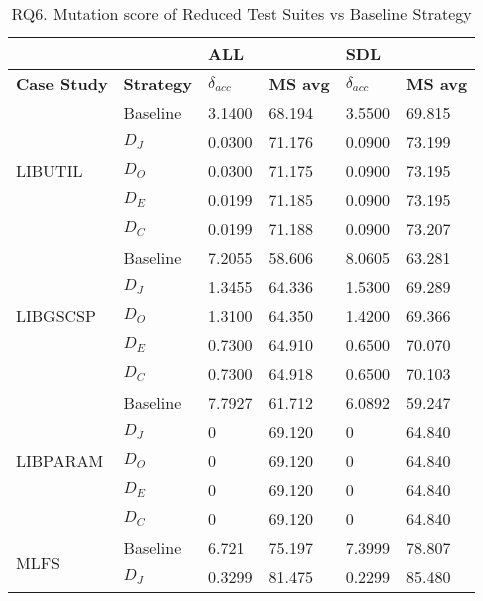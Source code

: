 
\begin{table}[]
\centering
\scriptsize
\caption{RQ6. Mutation score of Reduced Test Suites vs Baseline Strategy}
\label{table:results:msReducedBaseline} 
\begin{tabular}{|llllll|}
\hline
           &          & \textbf{ALL}  &  & \textbf{SDL} &    \\
\hline
\textbf{Case Study} & \textbf{Strategy} & \textbf{$\delta_{acc}$} & \textbf{MS avg} & \textbf{$\delta_{acc}$} & \textbf{MS avg}  \\
\hline
\multirow{5}{*}{LIBUTIL}    & Baseline & 3.1400 & 68.194 & 3.5500  &69.815 \\
           & $D_J$                    & 0.0300  & 71.176 & 0.0900  &73.199 \\
           & $D_O$                    & 0.0300  & 71.175 & 0.0900  &73.195 \\
           & $D_E$                    & 0.0199  & 71.185 & 0.0900  &73.195 \\
           & $D_C$                    & 0.0199  & 71.188 & 0.0900  &73.207\\
\hline
\multirow{5}{*}{LIBGSCSP}   & Baseline & 7.2055 & 58.606 & 8.0605 & 63.281  \\
           & $D_J$                    & 1.3455  & 64.336 &1.5300 & 69.289  \\
           & $D_O$                    & 1.3100  & 64.350  &1.4200 & 69.366 \\
           & $D_E$                    & 0.7300  & 64.910  &0.6500 & 70.070 \\
           & $D_C$                    & 0.7300  & 64.918 &0.6500 & 70.103 \\
\hline
\multirow{5}{*}{LIBPARAM}   & Baseline & 7.7927 &61.712  & 6.0892  &59.247 \\
           & $D_J$                    & 0     &69.120& 0  & 64.840   \\
           & $D_O$                    & 0     &69.120& 0  & 64.840   \\
           & $D_E$                    & 0     &69.120& 0  & 64.840   \\
           & $D_C$                    & 0     &69.120& 0  & 64.840   \\
\hline
\multirow{5}{*}{MLFS}       & Baseline &  6.721  &75.197   &    7.3999 &78.807    \\
           & $D_J$                      &   0.3299   & 81.475&    0.2299   &85.480 \\

\end{tabular}
\end{table}
